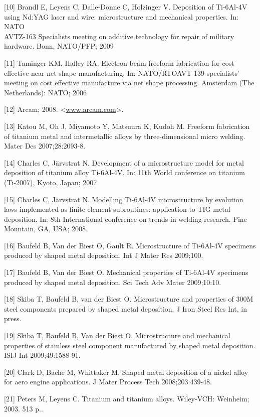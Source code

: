 \documentclass[10pt]{article}
\begin{document}
[10] Brandl E, Leyens C, Dalle-Donne C, Holzinger V. Deposition of Ti-6Al-4V using Nd:YAG laser and wire: microstructure and mechanical properties. In: NATO\\
AVTZ-163 Specialists meeting on additive technology for repair of military hardware. Bonn, NATO/PFP; 2009

[11] Taminger KM, Hafley RA. Electron beam freeform fabrication for cost effective near-net shape manufacturing. In: NATO/RTOAVT-139 specialists' meeting on cost effective manufacture via net shape processing. Amsterdam (The Netherlands): NATO; 2006

[12] Arcam; 2008. <\href{http://www.arcam.com}{www.arcam.com}>.

[13] Katou M, Oh J, Miyamoto Y, Matsuura K, Kudoh M. Freeform fabrication of titanium metal and intermetallic alloys by three-dimensional micro welding. Mater Des 2007;28:2093-8.

[14] Charles C, Järvstrat N. Development of a microstructure model for metal deposition of titanium alloy Ti-6Al-4V. In: 11th World conference on titanium (Ti-2007), Kyoto, Japan; 2007

[15] Charles C, Järvstrat N. Modelling Ti-6Al-4V microstructure by evolution laws implemented as finite element subroutines: application to TIG metal deposition. In: 8th International conference on trends in welding research. Pine Mountain, GA, USA; 2008.

[16] Baufeld B, Van der Biest O, Gault R. Microstructure of Ti-6Al-4V specimens produced by shaped metal deposition. Int J Mater Res 2009;100.

[17] Baufeld B, Van der Biest O. Mechanical properties of Ti-6Al-4V specimens produced by shaped metal deposition. Sci Tech Adv Mater 2009;10:10.

[18] Skiba T, Baufeld B, van der Biest O. Microstructure and properties of 300M steel components prepared by shaped metal deposition. J Iron Steel Res Int, in press.

[19] Skiba T, Baufeld B, Van der Biest O. Microstructure and mechanical properties of stainless steel component manufactured by shaped metal deposition. ISIJ Int 2009;49:1588-91.

[20] Clark D, Bache M, Whittaker M. Shaped metal deposition of a nickel alloy for aero engine applications. J Mater Process Tech 2008;203:439-48.

[21] Peters M, Leyens C. Titanium and titanium alloys. Wiley-VCH: Weinheim; 2003. 513 p..
\end{document}
